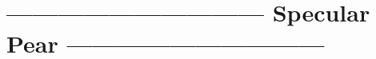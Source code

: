 \documentclass[11pt]{article}
\begin{document}
    \begin{center}
    \end{center}
    { \hspace*{\fill} \\}
    
    \begin{center}
    \end{center}
    { \hspace*{\fill} \\}
    
    \begin{center}
    \end{center}
    { \hspace*{\fill} \\}
    
    \begin{center}
    \end{center}
    { \hspace*{\fill} \\}
    
    \hypertarget{specular-pear}{%
\section{------------------------------ Specular Pear
------------------------------}\label{specular-pear}}
\end{document}
